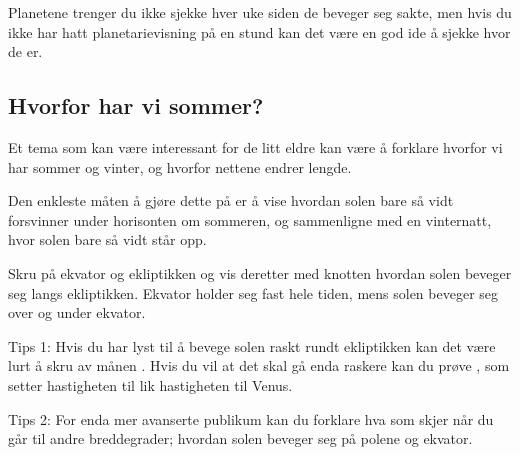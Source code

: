 \documentclass[../SommerstjernerA4.tex]{subfiles}
\begin{document}
Planetene trenger du ikke sjekke hver uke siden de beveger seg sakte, men hvis du ikke har hatt planetarievisning på en stund kan det være en god ide å sjekke hvor de er.

\subsection{Hvorfor har vi sommer?}
Et tema som kan være interessant for de litt eldre kan være å forklare hvorfor vi har sommer og vinter, og hvorfor nettene endrer lengde.

Den enkleste måten å gjøre dette på er å vise hvordan solen bare så vidt forsvinner under horisonten om sommeren, og sammenligne med en vinternatt, hvor solen bare så vidt står opp.

Skru på ekvator  og ekliptikken  og vis deretter med  knotten hvordan solen beveger seg langs ekliptikken. Ekvator holder seg fast hele tiden, mens solen beveger seg over og under ekvator.

Tips 1: Hvis du har lyst til å bevege solen raskt rundt ekliptikken kan det være lurt å skru av månen . Hvis du vil at det skal gå enda raskere kan du prøve , som setter hastigheten til  lik hastigheten til Venus.

Tips 2: For enda mer avanserte publikum kan du forklare hva som skjer når du går til andre breddegrader; hvordan solen beveger seg på polene og ekvator.
\end{document}
